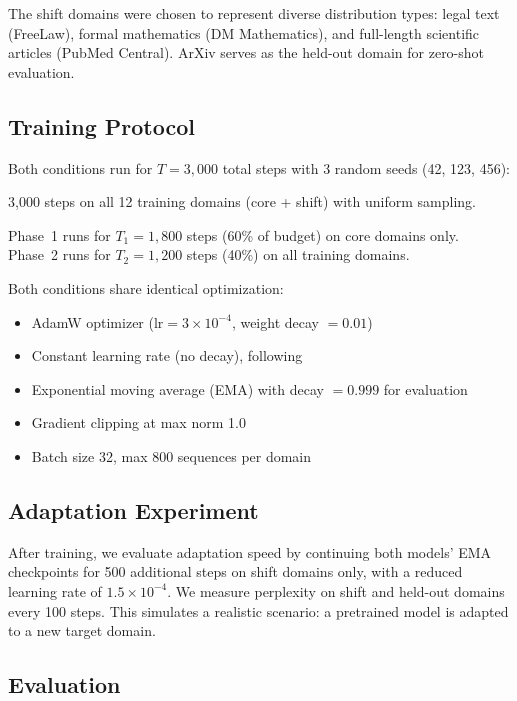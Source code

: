 The shift domains were chosen to represent diverse distribution types: legal text (FreeLaw), formal mathematics (DM Mathematics), and full-length scientific articles (PubMed Central). ArXiv serves as the held-out domain for zero-shot evaluation.

\subsection{Training Protocol}
\label{sec:training}

Both conditions run for $T = 3{,}000$ total steps with 3 random seeds (42, 123, 456):

 3{,}000 steps on all 12 training domains (core + shift) with uniform sampling.

 Phase~1 runs for $T_1 = 1{,}800$ steps (60\% of budget) on core domains only. Phase~2 runs for $T_2 = 1{,}200$ steps (40\%) on all training domains.

Both conditions share identical optimization:
\begin{itemize}[leftmargin=*,itemsep=0pt,topsep=0pt]
    \item AdamW optimizer ($\text{lr} = 3 \times 10^{-4}$, weight decay $= 0.01$)
    \item Constant learning rate (no decay), following \citet{luo2025lrdecay}
    \item Exponential moving average (EMA) with decay $= 0.999$ for evaluation
    \item Gradient clipping at max norm 1.0
    \item Batch size 32, max 800 sequences per domain
\end{itemize}

\subsection{Adaptation Experiment}
\label{sec:adaptation}

After training, we evaluate adaptation speed by continuing both models' EMA checkpoints for 500 additional steps on shift domains only, with a reduced learning rate of $1.5 \times 10^{-4}$. We measure perplexity on shift and held-out domains every 100 steps. This simulates a realistic scenario: a pretrained model is adapted to a new target domain.

\subsection{Evaluation}
\label{sec:eval}

